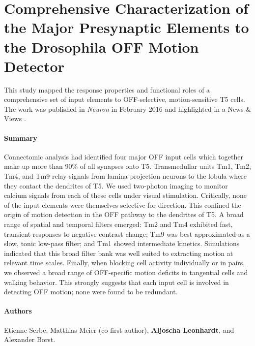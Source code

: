 \section[Comprehensive Characterization of the Major Presynaptic Elements to the \textit{Drosophila} OFF Motion Detector]{Comprehensive Characterization of the Major Presynaptic Elements to the Drosophila OFF Motion Detector}
\label{sct:manuscript_serbe}

This study mapped the response properties and functional roles of a comprehensive set of input elements to OFF-selective, motion-sensitive T5 cells. The work was published in \textit{Neuron} in February 2016 \citep{Serbe:2016ew} and highlighted in a News \& Views \citep{Tuthill:2016aa}.

\paragraph{Summary}
Connectomic analysis had identified four major OFF input cells which together make up more than 90\% of all synapses onto T5. Transmedullar units Tm1, Tm2, Tm4, and Tm9 relay signals from lamina projection neurons to the lobula where they contact the dendrites of T5. We used two-photon imaging to monitor calcium signals from each of these cells under visual stimulation. Critically, none of the input elements were themselves selective for direction. This confined the origin of motion detection in the OFF pathway to the dendrites of T5. A broad range of spatial and temporal filters emerged: Tm2 and Tm4 exhibited fast, transient responses to negative contrast change; Tm9 was best approximated as a slow, tonic low-pass filter; and Tm1 showed intermediate kinetics. Simulations indicated that this broad filter bank was well suited to extracting motion at relevant time scales. Finally, when blocking cell activity individually or in pairs, we observed a broad range of OFF-specific motion deficits in tangential cells and walking behavior. This strongly suggests that each input cell is involved in detecting OFF motion; none were found to be redundant.

\paragraph{Authors} Etienne Serbe, Matthias Meier (co-first author), \textbf{Aljoscha Leonhardt}, and Alexander Borst.

